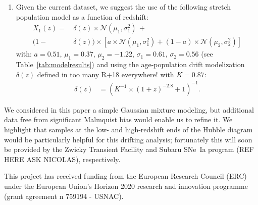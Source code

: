 \documentclass[]{aa} %
\newcommand{\mr}[1]{{\textcolor[rgb]{0.60,0.10,0.6}{#1}}}
\newcommand{\yc}[1]{{\textcolor{BrickRed}{#1}}}
\begin{document}
\begin{enumerate}
    \item \mr{Given the current dataset}, we suggest the use of the following stretch population model \yc{as a function of redshift}:
        \begin{align}
            \label{eqconclusion:stretchz}
            X_1\left(z \right) =
             &\,\delta(z)\times\mathcal{N}(\mu_1,\sigma_1^2)\,+\nonumber\\
            (1-&\,\delta(z)) \times  \left[a\times\mathcal{N}(\mu_1,\sigma_1^2) +
            (1-a)\times\mathcal{N}(\mu_2,\sigma_2^2)\right]
        \end{align}
    with: $a=0.51$, $\mu_1=0.37$, $\mu_2=-1.22$, $\sigma_1=0.61$,
    $\sigma_2=0.56$ (see Table~\ref{tab:modelresults}) and using the
    age-population drift modelization $\delta(z)$ defined in \cite{rigault2018} \yc{too many R+18 everywhere!}
    with $K=0.87$:
    \begin{align}
        \delta(z) & = \left( K^{-1} \times (1+z)^{-2.8} +1 \right)^{-1}.
    \end{align}
\end{enumerate}

\mr{We considered in this paper a simple Gaussian mixture modeling, but additional data free from
significant Malmquist bias would enable us to refine it. We highlight that samples at the low- and high-redshift ends of the Hubble diagram would be particularly helpful for this drifting analysis; fortunately this will soon be provided by the
Zwicky Transient Facility \citep{bellm2019, graham2019} and Subaru SNe~Ia program (REF HERE ASK NICOLAS), respectively.} 

\begin{acknowledgements}
    This project has received funding from the European Research Council (ERC)
    under the European Union's Horizon 2020 research and innovation programme
    (grant agreement n 759194 - USNAC).
\end{acknowledgements}
\end{document}
